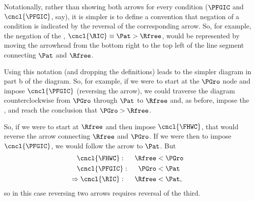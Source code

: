 \documentclass[\econtexRoot/BufferStockTheory]{subfiles}
\begin{document}
Notationally, rather than showing both arrows for every condition ($\PFGIC$ and $\cncl{\PFGIC}$, say), it is simpler is to define a convention that negation of a condition is indicated by the reversal of the corresponding arrow.  So, for example, the negation of the {\RIC},  $\cncl{\RIC} \equiv \Pat > \Rfree$, would be represented by moving the arrowhead from the bottom right to the top left of the line segment connecting {$\Pat$} and $\Rfree$.

\begin{comment}
\begin{figure}
\centering
\subfigure[Transparent Version (with definitions)]{\texttt{[image: \\FigDir/InequalityPFGICFHWCRIC]}}
\subfigure[Simplified Version (Same Content)]{\texttt{[image: \\FigDir/InequalityPFGICFHWCRIC-Simple]}}
\caption{Inequality Conditions for Perfect Foresight Model \\ (Start at a node and follow arrows)}
\label{fig:InequalityPFGICFHWCRIC}
\end{figure}
\end{comment}

Using this notation (and dropping the definitions) leads to the simpler diagram in part b of the diagram.  So, for example, if we were to start at the $\PGro$ node and impose $\cncl{\PFGIC}$ (reversing the arrow), we could traverse the diagram counterclockwise from $\PGro$ through $\Pat$ to $\Rfree$ and, as before, impose the {\RIC}, and reach the conclusion that $\PGro > \Rfree$.%

So, if we were to start at $\Rfree$ and then impose $\cncl{\FHWC}$, that would reverse the arrow connecting $\Rfree$ and $\PGro$.  If we were then to impose $\cncl{\PFGIC}$, we would follow the arrow to {$\Pat$}.  But
\begin{equation}\begin{gathered}\begin{aligned}
  \cncl{\FHWC}:~~~~  \Rfree & < \PGro \notag  
  \\ \cncl{\PFGIC}:~~~~ \PGro & < \Pat %
                                \label{eq:cnclRIC}
  \\ \Rightarrow \cncl{\RIC}:~~~~\Rfree & < \Pat \notag,
\end{aligned}\end{gathered}\end{equation}
so in this case reversing two arrows requires reversal of the third.
\end{document}
